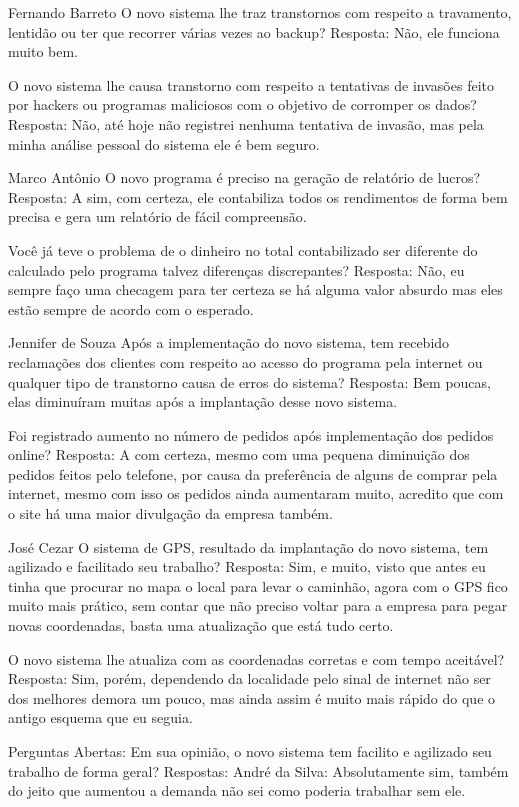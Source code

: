 Fernando Barreto
O novo sistema lhe traz transtornos com respeito a travamento, lentidão ou ter que recorrer várias vezes ao backup?
Resposta: Não, ele funciona muito bem.

O novo sistema lhe causa transtorno com respeito a tentativas de invasões feito por hackers ou programas maliciosos com o objetivo de corromper os dados?
Resposta: Não, até hoje não registrei nenhuma tentativa de invasão, mas pela minha análise pessoal do sistema ele é bem seguro.

Marco Antônio
O novo programa é preciso na geração de relatório de lucros?
Resposta: A sim, com certeza, ele contabiliza todos os rendimentos de forma bem precisa e gera um relatório de fácil compreensão.

Você já teve o problema de o dinheiro no total contabilizado ser diferente do calculado pelo programa talvez diferenças discrepantes?
Resposta: Não, eu sempre faço uma checagem para ter certeza se há alguma valor absurdo mas eles estão sempre de acordo com o esperado.


Jennifer de Souza
Após a implementação do novo sistema, tem recebido reclamações dos clientes com respeito ao acesso do programa pela internet ou qualquer tipo de transtorno causa de erros do sistema?
Resposta: Bem poucas, elas diminuíram muitas após a implantação desse novo sistema.

Foi registrado aumento no número de pedidos após implementação dos pedidos online?
Resposta: A com certeza, mesmo com uma pequena diminuição dos pedidos feitos pelo telefone, por causa da preferência de alguns de comprar pela internet, mesmo com isso os pedidos ainda aumentaram muito, acredito que com o site há uma maior divulgação da empresa também.


José Cezar
O sistema de GPS, resultado da implantação do novo sistema, tem agilizado e facilitado seu trabalho?
Resposta: Sim, e muito, visto que antes eu tinha que procurar no mapa o local para levar o caminhão, agora com o GPS fico muito mais prático, sem contar que não preciso voltar para a empresa para pegar novas coordenadas, basta uma atualização que está tudo certo.

O novo sistema lhe atualiza com as coordenadas corretas e com tempo aceitável?
Resposta: Sim, porém, dependendo da localidade pelo sinal de internet não ser dos melhores demora um pouco, mas ainda assim é muito mais rápido do que o antigo esquema que eu seguia.

Perguntas Abertas:
Em sua opinião, o novo sistema tem facilito e agilizado seu trabalho de forma geral?
Respostas:
André da Silva: Absolutamente sim, também do jeito que aumentou a demanda não sei como poderia trabalhar sem ele.

